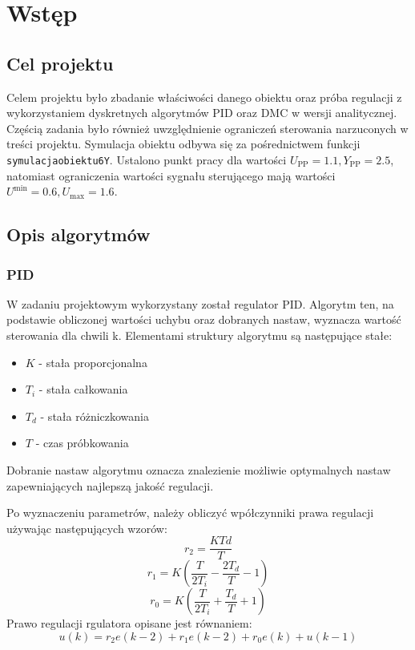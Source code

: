 \chapter{Wstęp}
\section{Cel projektu}
Celem projektu było zbadanie właściwości danego obiektu oraz próba regulacji z wykorzystaniem dyskretnych algorytmów PID oraz DMC w wersji analitycznej. Częścią zadania było również uwzględnienie ograniczeń sterowania narzuconych w treści projektu.
\newline Symulacja obiektu odbywa się za pośrednictwem funkcji \texttt{symulacja\textunderscore obiektu6Y}.
Ustalono punkt pracy dla wartości $U_{\textrm{PP}} = \num{1.1}, Y_{\textrm{PP}} = \num{2.5}$, natomiast ograniczenia wartości sygnału sterującego mają wartości $U^{\textrm{min}} = \num{0.6}, U_{\textrm{max}} = \num{1.6}$.

\section{Opis algorytmów}
\subsection{PID}
W zadaniu projektowym wykorzystany został regulator PID. Algorytm ten, na podstawie obliczonej wartości uchybu oraz dobranych nastaw, wyznacza wartość sterowania dla chwili k. Elementami struktury algorytmu są następujące stałe:
\begin{itemize}
	\item $K$ - stała proporcjonalna
	\item $T_i$ - stała całkowania
	\item $T_d$ - stała różniczkowania
	\item $T$ - czas próbkowania
\end{itemize}

Dobranie nastaw algorytmu oznacza znalezienie możliwie optymalnych nastaw zapewniających najlepszą jakość regulacji.
\par Po wyznaczeniu parametrów, należy obliczyć wpółczynniki prawa regulacji używając następujących wzorów:
\begin{equation}
    r_2 = \frac{KTd}{T}
\end{equation}
\begin{equation}
    r_1 = K(\frac{T}{2T_i}-\frac{2T_d}{T}-1)
\end{equation}
\begin{equation}
    r_0 = K(\frac{T}{2T_i}+\frac{T_d}{T}+1)
\end{equation}
Prawo regulacji rgulatora opisane jest równaniem:
\begin{equation}
    u(k) = r_2e(k-2)+r_1e(k-2)+r_0e(k) +u(k-1)
\end{equation}


